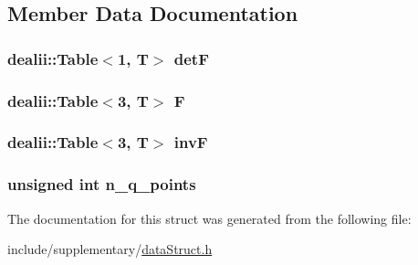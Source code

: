 \subsection{Member Data Documentation}
\subsubsection[{det\-F}]{\setlength{\rightskip}{0pt plus 5cm}dealii\-::\-Table$<$1, T$>$ det\-F}\label{structdeformation_map_aa1ff2dc8fb6f4f6e9125ca026505a977}
\subsubsection[{F}]{\setlength{\rightskip}{0pt plus 5cm}dealii\-::\-Table$<$3, T$>$ F}\label{structdeformation_map_a7934bed7ba72b5e4a3af1fd8a4e14198}
\subsubsection[{inv\-F}]{\setlength{\rightskip}{0pt plus 5cm}dealii\-::\-Table$<$3, T$>$ inv\-F}\label{structdeformation_map_ae40deb9e4616ec6d0b77519e56646ce0}
\subsubsection[{n\-\_\-q\-\_\-points}]{\setlength{\rightskip}{0pt plus 5cm}unsigned int n\-\_\-q\-\_\-points}\label{structdeformation_map_a75df8197cf561419d8ead67373abeafd}


The documentation for this struct was generated from the following file\-:\begin{DoxyCompactItemize}
\item 
include/supplementary/\hyperlink{data_struct_8h}{data\-Struct.\-h}\end{DoxyCompactItemize}
